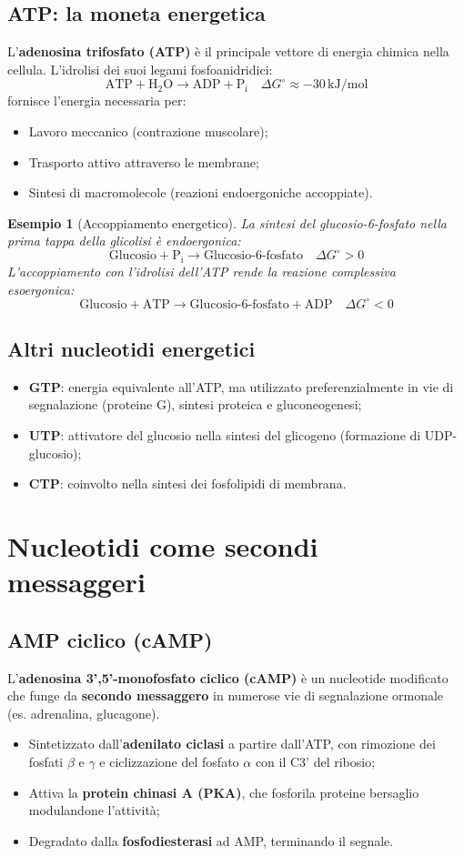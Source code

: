 \documentclass[12pt,a4paper]{report}
\newtheorem{esempio}{Esempio}[section]
\begin{document}
\subsection{ATP: la moneta energetica}
L'\textbf{adenosina trifosfato (ATP)} è il principale vettore di energia chimica nella cellula. L'idrolisi dei suoi legami fosfoanidridici:
\[
\mathrm{ATP + H_2O \rightarrow ADP + P_i} \quad \Delta G^\circ \approx -30\,\mathrm{kJ/mol}
\]
fornisce l'energia necessaria per:
\begin{itemize}
\item Lavoro meccanico (contrazione muscolare);
\item Trasporto attivo attraverso le membrane;
\item Sintesi di macromolecole (reazioni endoergoniche accoppiate).
\end{itemize}
\begin{esempio}[Accoppiamento energetico]
La sintesi del glucosio-6-fosfato nella prima tappa della glicolisi è endoergonica:
\[
\text{Glucosio} + \mathrm{P_i} \rightarrow \text{Glucosio-6-fosfato} \quad \Delta G^\circ > 0
\]
L'accoppiamento con l'idrolisi dell'ATP rende la reazione complessiva esoergonica:
\[
\text{Glucosio} + \mathrm{ATP} \rightarrow \text{Glucosio-6-fosfato} + \mathrm{ADP} \quad \Delta G^\circ < 0
\]
\end{esempio}
\subsection{Altri nucleotidi energetici}
\begin{itemize}
\item \textbf{GTP}: energia equivalente all'ATP, ma utilizzato preferenzialmente in vie di segnalazione (proteine G), sintesi proteica e gluconeogenesi;
\item \textbf{UTP}: attivatore del glucosio nella sintesi del glicogeno (formazione di UDP-glucosio);
\item \textbf{CTP}: coinvolto nella sintesi dei fosfolipidi di membrana.
\end{itemize}

\section{Nucleotidi come secondi messaggeri}
\subsection{AMP ciclico (cAMP)}
L'\textbf{adenosina 3',5'-monofosfato ciclico (cAMP)} è un nucleotide modificato che funge da \textbf{secondo messaggero} in numerose vie di segnalazione ormonale (es. adrenalina, glucagone).
\begin{itemize}
\item Sintetizzato dall'\textbf{adenilato ciclasi} a partire dall'ATP, con rimozione dei fosfati $\beta$ e $\gamma$ e ciclizzazione del fosfato $\alpha$ con il C3' del ribosio;
\item Attiva la \textbf{protein chinasi A (PKA)}, che fosforila proteine bersaglio modulandone l'attività;
\item Degradato dalla \textbf{fosfodiesterasi} ad AMP, terminando il segnale.
\end{itemize}
\end{document}
